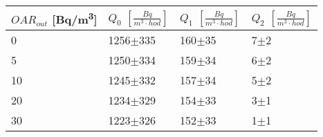 \begin{tabular}{llll}
\toprule
$OAR_{out}$ [\si{Bq/m^3}] & $Q_0$ $\left[\si{\frac{Bq}{m^3\cdot hod}}\right]$ & $Q_1$ $\left[\si{\frac{Bq}{m^3\cdot hod}}\right]$ & $Q_2$ $\left[\si{\frac{Bq}{m^3\cdot hod}}\right]$ \\
\midrule
0  &                                        1256$\pm$335 &                                          160$\pm$35 &                                             7$\pm$2 \\
5  &                                        1250$\pm$334 &                                          159$\pm$34 &                                             6$\pm$2 \\
10 &                                        1245$\pm$332 &                                          157$\pm$34 &                                             5$\pm$2 \\
20 &                                        1234$\pm$329 &                                          154$\pm$33 &                                             3$\pm$1 \\
30 &                                        1223$\pm$326 &                                          152$\pm$33 &                                             1$\pm$1 \\
\bottomrule
\end{tabular}
